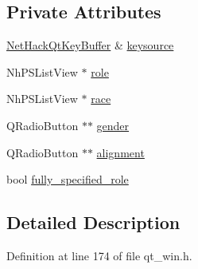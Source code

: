 \subsection*{Private Attributes}
\begin{DoxyCompactItemize}
\item 
\hyperlink{classNetHackQtKeyBuffer}{Net\+Hack\+Qt\+Key\+Buffer} \& \hyperlink{classNetHackQtPlayerSelector_a62e65e128d1b599d43ae2e3b2ba1704f}{keysource}
\item 
Nh\+P\+S\+List\+View $\ast$ \hyperlink{classNetHackQtPlayerSelector_ae78e6cfd7a34b808d67d9bb01605a6c1}{role}
\item 
Nh\+P\+S\+List\+View $\ast$ \hyperlink{classNetHackQtPlayerSelector_a04b1f079d0191713b83d87a15ece945d}{race}
\item 
Q\+Radio\+Button $\ast$$\ast$ \hyperlink{classNetHackQtPlayerSelector_a275924ce70d6e47c65ea30bb86e25c5b}{gender}
\item 
Q\+Radio\+Button $\ast$$\ast$ \hyperlink{classNetHackQtPlayerSelector_a901b2d9f9cc77b3a658d41feb06a0fec}{alignment}
\item 
bool \hyperlink{classNetHackQtPlayerSelector_ade1b991d06797000f5d8e4d807711f16}{fully\+\_\+specified\+\_\+role}
\end{DoxyCompactItemize}


\subsection{Detailed Description}


Definition at line 174 of file qt\+\_\+win.\+h.



